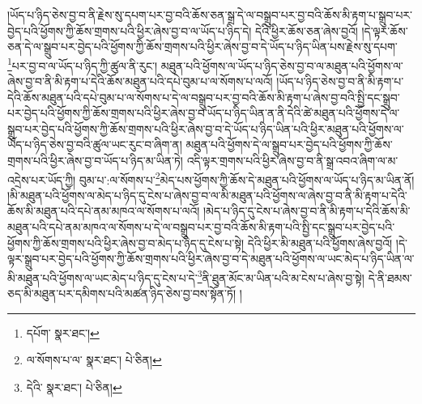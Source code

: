 །ཡོད་པ་ཉིད་ཅེས་བྱ་བ་ནི་རྗེས་སུ་དཔག་པར་བྱ་བའི་ཆོས་ཅན་སྒྲ་དེ་ལ་བསྒྲུབ་པར་བྱ་བའི་ཆོས་མི་རྟག་པ་སྒྲུབ་པར་བྱེད་པའི་ཕྱོགས་ཀྱི་ཆོས་གྲགས་པའི་ཕྱིར་ཞེས་བྱ་བ་ལ་ཡོད་པ་ཉིད་དེ། དེའི་ཕྱིར་ཆོས་ཅན་ཞེས་བྱའོ། །དེ་ལྟར་ཆོས་ཅན་དེ་ལ་སྒྲུབ་པར་བྱེད་པའི་ཕྱོགས་ཀྱི་ཆོས་གྲགས་པའི་ཕྱིར་ཞེས་བྱ་བ་དེ་ཡོད་པ་ཉིད་ཡིན་པས་རྗེས་སུ་དཔག་\footnote{དཔོག་  སྣར་ཐང་། }པར་བྱ་བ་ལ་ཡོད་པ་ཉིད་ཀྱི་ཚུལ་ནི་རུང་། མཐུན་པའི་ཕྱོགས་ལ་ཡོད་པ་ཉིད་ཅེས་བྱ་བ་ལ་མཐུན་པའི་ཕྱོགས་ལ་ཞེས་བྱ་བ་ནི་མི་རྟག་པ་དེའི་ཆོས་མཐུན་པའི་དཔེ་བུམ་པ་ལ་སོགས་པ་ལའོ། །ཡོད་པ་ཉིད་ཅེས་བྱ་བ་ནི་མི་རྟག་པ་དེའི་ཆོས་མཐུན་པའི་དཔེ་བུམ་པ་ལ་སོགས་པ་དེ་ལ་བསྒྲུབ་པར་བྱ་བའི་ཆོས་མི་རྟག་པ་ཞེས་བྱ་བའི་སྤྱི་དང་སྒྲུབ་པར་བྱེད་པའི་ཕྱོགས་ཀྱི་ཆོས་གྲགས་པའི་ཕྱིར་ཞེས་བྱ་བ་ཡོད་པ་ཉིད་ཡིན་ན་ནི་དེའི་ཚེ་མཐུན་པའི་ཕྱོགས་དེ་ལ་སྒྲུབ་པར་བྱེད་པའི་ཕྱོགས་ཀྱི་ཆོས་གྲགས་པའི་ཕྱིར་ཞེས་བྱ་བ་དེ་ཡོད་པ་ཉིད་ཡིན་པའི་ཕྱིར་མཐུན་པའི་ཕྱོགས་ལ་ཡོད་པ་ཉིད་ཅེས་བྱ་བའི་ཚུལ་ཡང་རུང་བ་ཞིག་ན། མཐུན་པའི་ཕྱོགས་དེ་ལ་སྒྲུབ་པར་བྱེད་པའི་ཕྱོགས་ཀྱི་ཆོས་གྲགས་པའི་ཕྱིར་ཞེས་བྱ་བ་ཡོད་པ་ཉིད་མ་ཡིན་ཏེ། འདི་ལྟར་གྲགས་པའི་ཕྱིར་ཞེས་བྱ་བ་ནི་སྒྲ་འབའ་ཞིག་ལ་མ་འདྲེས་པར་ཡོད་ཀྱི། བུམ་པ་:ལ་སོགས་པ་\footnote{ལ་སོགས་པ་ལ་  སྣར་ཐང་།  པེ་ཅིན། }མེད་པས་ཕྱོགས་ཀྱི་ཆོས་དེ་མཐུན་པའི་ཕྱོགས་ལ་ཡོད་པ་ཉིད་མ་ཡིན་ནོ། །མི་མཐུན་པའི་ཕྱོགས་ལ་མེད་པ་ཉིད་དུ་ངེས་པ་ཞེས་བྱ་བ་ལ་མི་མཐུན་པའི་ཕྱོགས་ལ་ཞེས་བྱ་བ་ནི་མི་རྟག་པ་དེའི་ཆོས་མི་མཐུན་པའི་དཔེ་ནམ་མཁའ་ལ་སོགས་པ་ལའོ། །མེད་པ་ཉིད་དུ་ངེས་པ་ཞེས་བྱ་བ་ནི་མི་རྟག་པ་དེའི་ཆོས་མི་མཐུན་པའི་དཔེ་ནམ་མཁའ་ལ་སོགས་པ་དེ་ལ་བསྒྲུབ་པར་བྱ་བའི་ཆོས་མི་རྟག་པའི་སྤྱི་དང་སྒྲུབ་པར་བྱེད་པའི་ཕྱོགས་ཀྱི་ཆོས་གྲགས་པའི་ཕྱིར་ཞེས་བྱ་བ་མེད་པ་ཉིད་དུ་ངེས་པ་སྟེ། དེའི་ཕྱིར་མི་མཐུན་པའི་ཕྱོགས་ཞེས་བྱའོ། །དེ་ལྟར་སྒྲུབ་པར་བྱེད་པའི་ཕྱོགས་ཀྱི་ཆོས་གྲགས་པའི་ཕྱིར་ཞེས་བྱ་བ་དེ་མཐུན་པའི་ཕྱོགས་ལ་ཡང་མེད་པ་ཉིད་ཡིན་ལ་མི་མཐུན་པའི་ཕྱོགས་ལ་ཡང་མེད་པ་ཉིད་དུ་ངེས་པ་དེ་\footnote{དེའི་  སྣར་ཐང་།  པེ་ཅིན། }ནི་ཐུན་མོང་མ་ཡིན་པའི་མ་ངེས་པ་ཞེས་བྱ་སྟེ། དེ་ནི་ཐམས་ཅད་མི་མཐུན་པར་དམིགས་པའི་མཚན་ཉིད་ཅེས་བྱ་བས་སྟོན་ཏོ། །
